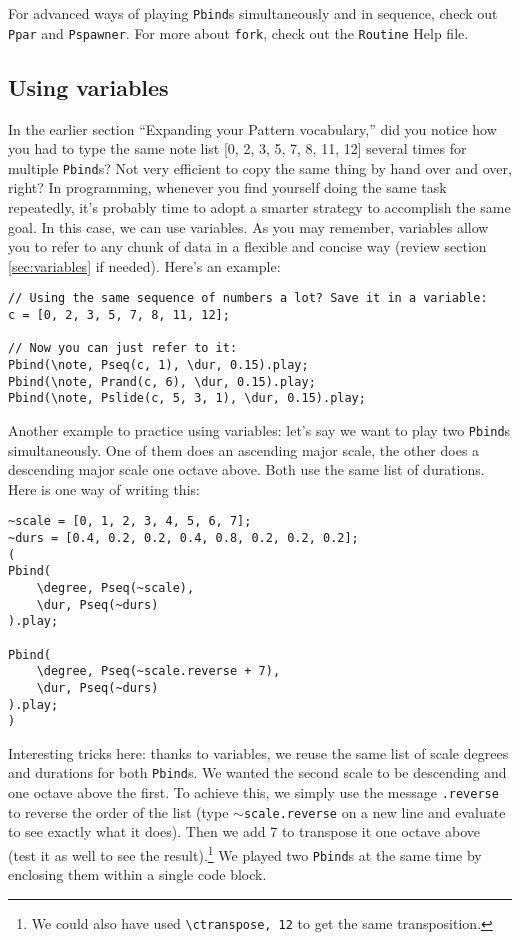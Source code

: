 For advanced ways of playing \texttt{Pbind}s simultaneously and in sequence, check out \texttt{Ppar} and \texttt{Pspawner}. For more about \texttt{fork}, check out the \texttt{Routine} Help file.

\subsection{Using variables}

In the earlier section ``Expanding your Pattern vocabulary,'' did you notice how you had to type the same note list [0, 2, 3, 5, 7, 8, 11, 12] several times for multiple \texttt{Pbind}s? Not very efficient to copy the same thing by hand over and over, right? In programming, whenever you find yourself doing the same task repeatedly, it's probably time to adopt a smarter strategy to accomplish the same goal. In this case, we can use variables. As you may remember, variables allow you to refer to any chunk of data in a flexible and concise way (review section  \ref{sec:variables} if needed). Here's an example:

\begin{lstlisting}[style=SuperCollider-IDE, basicstyle=\scttfamily\footnotesize]
// Using the same sequence of numbers a lot? Save it in a variable:
c = [0, 2, 3, 5, 7, 8, 11, 12];

// Now you can just refer to it:
Pbind(\note, Pseq(c, 1), \dur, 0.15).play;
Pbind(\note, Prand(c, 6), \dur, 0.15).play;
Pbind(\note, Pslide(c, 5, 3, 1), \dur, 0.15).play;
\end{lstlisting}
 
Another example to practice using variables: let's say we want to play two \texttt{Pbind}s simultaneously. One of them does an ascending major scale, the other does a descending major scale one octave above. Both use the same list of durations. Here is one way of writing this:
 
\begin{lstlisting}[style=SuperCollider-IDE, basicstyle=\scttfamily\footnotesize]
~scale = [0, 1, 2, 3, 4, 5, 6, 7];
~durs = [0.4, 0.2, 0.2, 0.4, 0.8, 0.2, 0.2, 0.2];
(
Pbind(
	\degree, Pseq(~scale),
	\dur, Pseq(~durs)
).play;

Pbind(
	\degree, Pseq(~scale.reverse + 7),
	\dur, Pseq(~durs)
).play;
)
\end{lstlisting}
 
Interesting tricks here: thanks to variables, we reuse the same list of scale degrees and durations for both \texttt{Pbind}s. We wanted the second scale to be descending and one octave above the first. To achieve this, we simply use the message \texttt{.reverse} to reverse the order of the list (type \texttt{$\sim$scale.reverse} on a new line and evaluate to see exactly what it does). Then we add 7 to transpose it one octave above (test it as well to see the result).\footnote{We could also have used \texttt{\textbackslash ctranspose, 12} to get the same transposition.} We played two \texttt{Pbind}s at the same time by enclosing them within a single code block.

